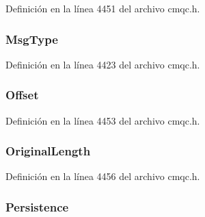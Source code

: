 Definición en la línea 4451 del archivo cmqc.\+h.

\hypertarget{structtag_m_q_m_d_a22732037d5385ab03eb3e9d9a5e60843}{}
\subsubsection[{Msg\+Type}]{ Msg\+Type}\label{structtag_m_q_m_d_a22732037d5385ab03eb3e9d9a5e60843}


Definición en la línea 4423 del archivo cmqc.\+h.

\hypertarget{structtag_m_q_m_d_aac8433c970f16a602e3b79400e87d28b}{}
\subsubsection[{Offset}]{ Offset}\label{structtag_m_q_m_d_aac8433c970f16a602e3b79400e87d28b}


Definición en la línea 4453 del archivo cmqc.\+h.

\hypertarget{structtag_m_q_m_d_acf39c0c6d2618f565cf8315c8775b5ae}{}
\subsubsection[{Original\+Length}]{ Original\+Length}\label{structtag_m_q_m_d_acf39c0c6d2618f565cf8315c8775b5ae}


Definición en la línea 4456 del archivo cmqc.\+h.

\hypertarget{structtag_m_q_m_d_af0f253d60fa2dcbe2bda530c88661853}{}
\subsubsection[{Persistence}]{ Persistence}\label{structtag_m_q_m_d_af0f253d60fa2dcbe2bda530c88661853}


